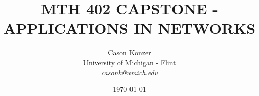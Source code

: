 \documentclass[a4paper, 12pt]{article} %
\date{\today} %
\begin{document}
\title{MTH 402 CAPSTONE - APPLICATIONS IN NETWORKS}

\vspace{0.25cm}
\author{Cason Konzer  \\ %
       University of Michigan - Flint \\ %
       \textit{ \color{violet}
       \href{mailto:casonk@umich.edu}{casonk@umich.edu}}  %
       }%

\maketitle

\thispagestyle{empty}

\end{document}
